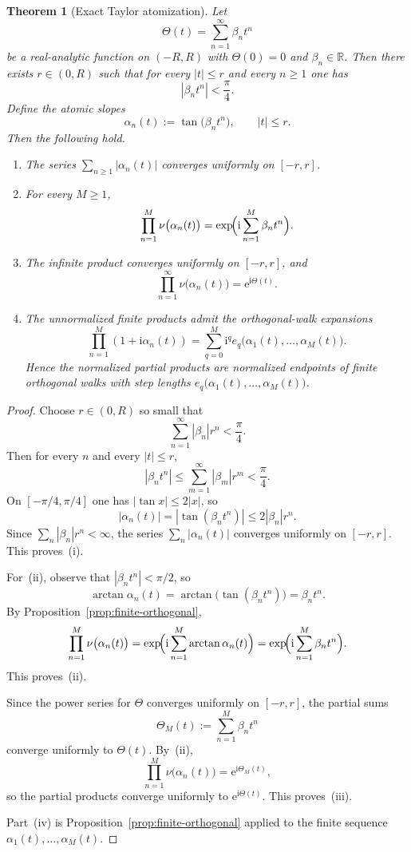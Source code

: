 \documentclass[11pt]{amsart}
\numberwithin{equation}{section}
\newtheorem{theorem}{Theorem}[section]
\theoremstyle{definition}
\theoremstyle{remark}
\newcommand{\RR}{\mathbb R}
\newcommand{\e}{\mathrm e}
\newcommand{\ii}{\mathrm i}
\begin{document}
\begin{theorem}[Exact Taylor atomization]\label{thm:taylor-atomization}
Let
\[
\Theta(t)=\sum_{n=1}^{\infty}\beta_n t^n
\]
be a real-analytic function on $(-R,R)$ with $\Theta(0)=0$ and $\beta_n\in\RR$.  Then there exists $r\in(0,R)$ such that for every $|t|\le r$ and every $n\ge1$ one has
\[
|\beta_n t^n|<\frac{\pi}{4}.
\]
Define the atomic slopes
\[
\alpha_n(t):=\tan\bigl(\beta_n t^n\bigr),\qquad |t|\le r.
\]
Then the following hold.
\begin{enumerate}[label=(\roman*)]
\item The series $\sum_{n\ge1}|\alpha_n(t)|$ converges uniformly on $[-r,r]$.
\item For every $M\ge1$,
\[
\prod_{n=1}^M \nu\bigl(\alpha_n(t)\bigr)=\exp\!\Bigl(\ii\sum_{n=1}^M\beta_n t^n\Bigr).
\]
\item The infinite product converges uniformly on $[-r,r]$, and
\[
\prod_{n=1}^{\infty}\nu\bigl(\alpha_n(t)\bigr)=\e^{\ii\Theta(t)}.
\]
\item The unnormalized finite products admit the orthogonal-walk expansions
\[
\prod_{n=1}^M (1+\ii\alpha_n(t))=
\sum_{q=0}^M \ii^q e_q\bigl(\alpha_1(t),\dots,\alpha_M(t)\bigr).
\]
Hence the normalized partial products are normalized endpoints of finite orthogonal walks with step lengths $e_q\bigl(\alpha_1(t),\dots,\alpha_M(t)\bigr)$.
\end{enumerate}
\end{theorem}

\begin{proof}
Choose $r\in(0,R)$ so small that
\[
\sum_{n=1}^{\infty}|\beta_n|r^n<\frac{\pi}{4}.
\]
Then for every $n$ and every $|t|\le r$,
\[
|\beta_n t^n|\le \sum_{m=1}^{\infty}|\beta_m|r^m<\frac{\pi}{4}.
\]
On $[-\pi/4,\pi/4]$ one has $|\tan x|\le 2|x|$, so
\[
|\alpha_n(t)|=|\tan(\beta_n t^n)|\le 2|\beta_n|r^n.
\]
Since $\sum_n |\beta_n|r^n<\infty$, the series $\sum_n |\alpha_n(t)|$ converges uniformly on $[-r,r]$.  This proves~(i).

For~(ii), observe that $|\beta_n t^n|<\pi/2$, so
\[
\arctan\alpha_n(t)=\arctan\bigl(\tan(\beta_n t^n)\bigr)=\beta_n t^n.
\]
By Proposition~\ref{prop:finite-orthogonal},
\[
\prod_{n=1}^M \nu\bigl(\alpha_n(t)\bigr)
=\exp\!\Bigl(\ii\sum_{n=1}^M \arctan\alpha_n(t)\Bigr)
=\exp\!\Bigl(\ii\sum_{n=1}^M \beta_n t^n\Bigr).
\]
This proves~(ii).

Since the power series for $\Theta$ converges uniformly on $[-r,r]$, the partial sums
\[
\Theta_M(t):=\sum_{n=1}^M\beta_n t^n
\]
converge uniformly to $\Theta(t)$.  By~(ii),
\[
\prod_{n=1}^M \nu\bigl(\alpha_n(t)\bigr)=\e^{\ii\Theta_M(t)},
\]
so the partial products converge uniformly to $\e^{\ii\Theta(t)}$.  This proves~(iii).

Part~(iv) is Proposition~\ref{prop:finite-orthogonal} applied to the finite sequence $\alpha_1(t),\dots,\alpha_M(t)$.
\end{proof}
\end{document}
